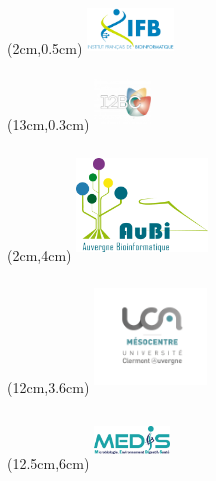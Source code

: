 
\begin{frame}
  \titlepage
  \begin{textblock*}{5cm}(2cm,0.5cm) %
  \includegraphics[width=2.3cm,height=1.3cm]{images/logo_ifb.pdf}
  \end{textblock*}
  \begin{textblock*}{5cm}(13cm,0.3cm) %
  \includegraphics[width=1.5cm,height=1.5cm]{images/i2bc.png}
  \end{textblock*}
  \begin{textblock*}{5cm}(2cm,4cm) %
  \includegraphics[width=3.5cm,height=3cm]{images/logoAuBi-2019.pdf}
  \end{textblock*}
  \begin{textblock*}{5cm}(12cm,3.6cm) %
  \includegraphics[width=3cm,height=3cm]{images/mesocentre.png}
  \end{textblock*}
   \begin{textblock*}{5cm}(12.5cm,6cm) %
  \includegraphics[width=2cm,height=1.5cm]{images/medis_logo.png}
  \end{textblock*}
\end{frame}

